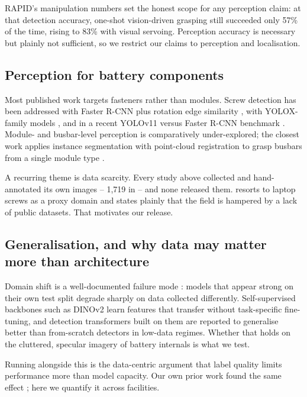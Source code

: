 \documentclass[conference]{IEEEtran}
\begin{document}
RAPID's manipulation numbers set the honest scope for any perception claim: at that
detection accuracy, one-shot vision-driven grasping still succeeded only 57\% of the
time, rising to 83\% with visual servoing. Perception accuracy is necessary but
plainly not sufficient, so we restrict our claims to perception and localisation.

\subsection{Perception for battery components}
Most published work targets fasteners rather than modules. Screw detection has been
addressed with Faster R-CNN plus rotation edge similarity \cite{screwrcnn2021}, with
YOLOX-family models \cite{screwbatt2023}, and in a recent YOLOv11 versus Faster R-CNN
benchmark \cite{screwcompare2026}. Module- and busbar-level perception is
comparatively under-explored; the closest work applies instance segmentation with
point-cloud registration to grasp busbars from a single module type
\cite{cvmodule2023}.

A recurring theme is data scarcity. Every study above collected and hand-annotated
its own images -- 1,719 in \cite{screwbatt2023} -- and none released them.
\cite{screwcompare2026} resorts to laptop screws as a proxy domain and states plainly
that the field is hampered by a lack of public datasets. That motivates our release.

\subsection{Generalisation, and why data may matter more than architecture}
Domain shift is a well-documented failure mode \cite{recht2019,koh2021wilds}: models
that appear strong on their own test split degrade sharply on data collected
differently. Self-supervised backbones such as DINOv2 \cite{dinov2} learn features
that transfer without task-specific fine-tuning, and detection transformers built on
them \cite{rfdetr} are reported to generalise better than from-scratch detectors in
low-data regimes. Whether that holds on the cluttered, specular imagery of battery
internals is what we test.

Running alongside this is the data-centric argument \cite{northcutt2021} that label
quality limits performance more than model capacity. Our own prior work found the
same effect \cite{katiyar2026mvml}; here we quantify it across facilities.
\end{document}
